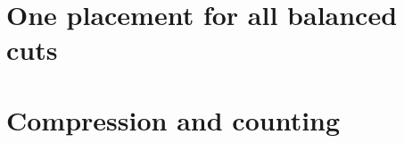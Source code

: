 \documentclass[11pt]{article}
\begin{document}
\maketitle

\begin{abstract}
We prove that over every field, arithmetic circuits for the directed
Hamiltonian cycle polynomial of order $N$ require at least
$\exp\!\bigl(c(\log N)^2/(\log\log N)^2\bigr)$ gates for all
sufficiently large $N$. The constant $c>0$ is absolute, and the
threshold depends only on the characteristic. The same lower bound holds
for the permanent outside characteristic two. Both bounds hold even
when a circuit need only approximate the coefficients of degree $N$.
\end{abstract}


\clearpage
{\small\tableofcontents}
\clearpage


\part{One placement for all balanced cuts}\label{part:no}









\clearpage
\part{Compression and counting}\label{part:port}











\end{document}
